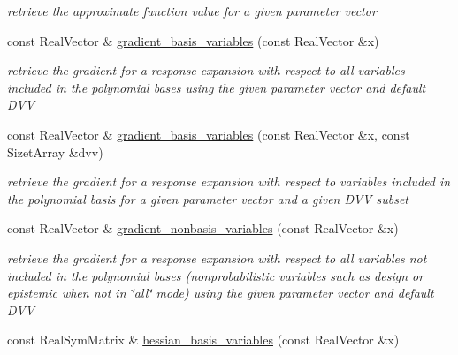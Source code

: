\begin{DoxyCompactItemize}
\begin{DoxyCompactList}\small\item\em retrieve the approximate function value for a given parameter vector \end{DoxyCompactList}\item 
const Real\+Vector \& \hyperlink{classPecos_1_1OrthogPolyApproximation_ae3b6ea541392b74cf0cc8758e206277c}{gradient\+\_\+basis\+\_\+variables} (const Real\+Vector \&x)\label{classPecos_1_1OrthogPolyApproximation_ae3b6ea541392b74cf0cc8758e206277c}

\begin{DoxyCompactList}\small\item\em retrieve the gradient for a response expansion with respect to all variables included in the polynomial bases using the given parameter vector and default D\+VV \end{DoxyCompactList}\item 
const Real\+Vector \& \hyperlink{classPecos_1_1OrthogPolyApproximation_a3ffb563ae1658344bfc2ad882def9e7c}{gradient\+\_\+basis\+\_\+variables} (const Real\+Vector \&x, const Sizet\+Array \&dvv)\label{classPecos_1_1OrthogPolyApproximation_a3ffb563ae1658344bfc2ad882def9e7c}

\begin{DoxyCompactList}\small\item\em retrieve the gradient for a response expansion with respect to variables included in the polynomial basis for a given parameter vector and a given D\+VV subset \end{DoxyCompactList}\item 
const Real\+Vector \& \hyperlink{classPecos_1_1OrthogPolyApproximation_a518e8604f973a4b161a9b5718a0aa25e}{gradient\+\_\+nonbasis\+\_\+variables} (const Real\+Vector \&x)\label{classPecos_1_1OrthogPolyApproximation_a518e8604f973a4b161a9b5718a0aa25e}

\begin{DoxyCompactList}\small\item\em retrieve the gradient for a response expansion with respect to all variables not included in the polynomial bases (nonprobabilistic variables such as design or epistemic when not in \char`\"{}all\char`\"{} mode) using the given parameter vector and default D\+VV \end{DoxyCompactList}\item 
const Real\+Sym\+Matrix \& \hyperlink{classPecos_1_1OrthogPolyApproximation_a830729654265d84af637960f8c63f2bc}{hessian\+\_\+basis\+\_\+variables} (const Real\+Vector \&x)\label{classPecos_1_1OrthogPolyApproximation_a830729654265d84af637960f8c63f2bc}


\end{DoxyCompactItemize}
